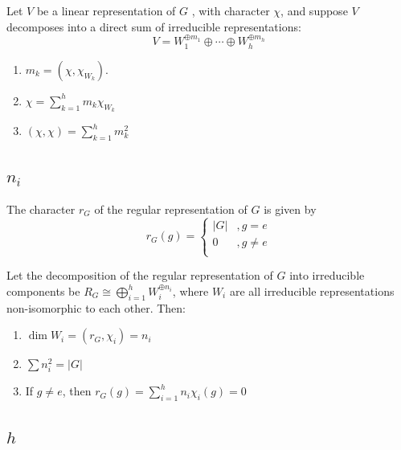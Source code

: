 \documentclass[12pt, oneside]{book}
\begin{document}
\begin{theorem}
    Let $V$ be a linear representation of $G$ , with character $\chi$, and suppose $V$ decomposes into a direct sum of irreducible representations:
    \begin{equation*}
        V=W_1^{\oplus m_1} \oplus \cdots \oplus W_h^{\oplus m_h}
    \end{equation*}
    \begin{enumerate}
        \item
              $m_k=(\chi, \chi_{W_k})$.
        \item
              $\chi = \sum_{k=1}^h m_k \chi_{W_k}$
        \item  $\left(\chi,\chi \right)=\sum_{k=1}^h m_k^2$
    \end{enumerate}
\end{theorem}



\subsection{$n_i$}
\begin{proposition}
    The character $r_G$ of the regular representation of $G$ is given by
    \begin{equation*}
        r_G(g)
        =
        \begin{cases}
            \left|G\right| & ,g=e      \\
            0              & ,g \neq e \\
        \end{cases}
    \end{equation*}
\end{proposition}
\begin{corollary}
    Let the decomposition of the regular representation of $G$ into irreducible components be $R_G\cong \bigoplus_{i=1}^h W_i^{\oplus n_i}$, where $W_i$ are all irreducible representations non-isomorphic to each other.
    Then:
    \begin{enumerate}
        \item
              $\dim W_i=\left(r_G,\chi_i \right)=n_i$
        \item
              $\sum n_i^2 = |G|$
        \item
              If $g\neq e$, then $r_G(g)=\sum_{i=1}^{h}n_i\chi_i(g)=0$
    \end{enumerate}
\end{corollary}

\subsection{$h$}
\end{document}
